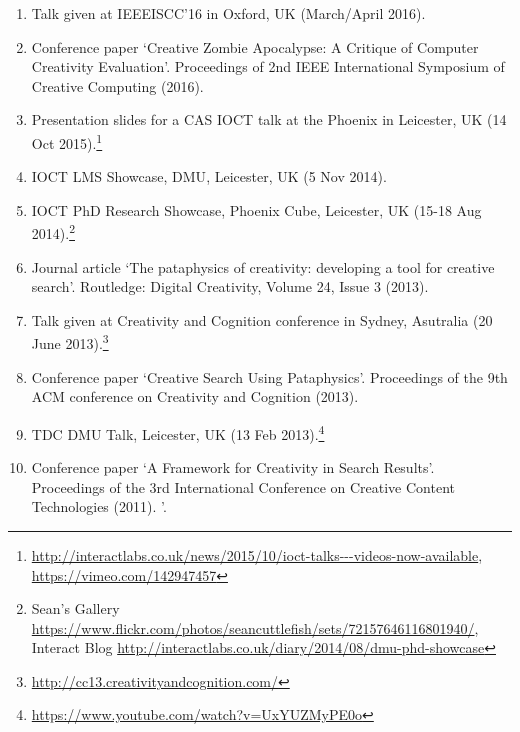 \begin{enumerate}
  \item Talk given at IEEEISCC'16 in Oxford, UK (March/April 2016).
  \item Conference paper `Creative Zombie Apocalypse: A Critique of Computer Creativity Evaluation'. Proceedings of 2nd IEEE International Symposium of Creative Computing (2016).
  \item Presentation slides for a \ac{CAS} \ac{IOCT} talk at the Phoenix in Leicester, UK (14 Oct 2015).\footnote{\url{http://interactlabs.co.uk/news/2015/10/ioct-talks---videos-now-available}, \url{https://vimeo.com/142947457}}
  \item \ac{IOCT} \ac{LMS} Showcase, \ac{DMU}, Leicester, UK (5 Nov 2014).
  \item \ac{IOCT} PhD Research Showcase, Phoenix Cube, Leicester, UK (15-18 Aug 2014).\footnote{Sean's Gallery \url{https://www.flickr.com/photos/seancuttlefish/sets/72157646116801940/}, Interact Blog \url{http://interactlabs.co.uk/diary/2014/08/dmu-phd-showcase}}
  \item Journal article `The pataphysics of creativity: developing a tool for creative search'. Routledge: Digital Creativity, Volume 24, Issue 3 (2013).
  \item Talk given at Creativity and Cognition conference in Sydney, Asutralia (20 June 2013).\footnote{\url{http://cc13.creativityandcognition.com/}}
  \item Conference paper `Creative Search Using Pataphysics'. Proceedings of the 9th ACM conference on Creativity and Cognition (2013).
  \item \ac{TDC} \ac{DMU} Talk, Leicester, UK (13 Feb 2013).\footnote{\url{https://www.youtube.com/watch?v=UxYUZMyPE0o}}
  \item Conference paper `A Framework for Creativity in Search Results'. Proceedings of the 3rd International Conference on Creative Content Technologies (2011).
'.
\end{enumerate}

\addtocounter{section}{1}



\addtocounter{section}{1}



